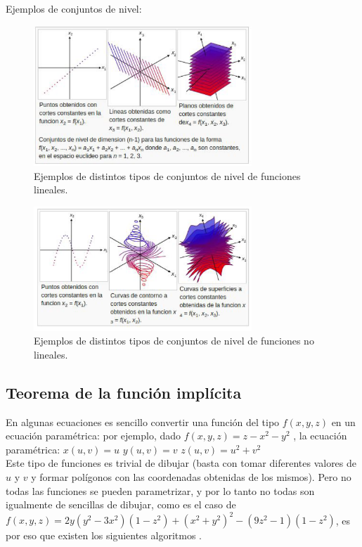 \documentclass[12pt]{article}
\begin{document}
Ejemplos de conjuntos de nivel:
\begin{figure}[h!]
\includegraphics[width=0.73\textwidth,center]{meshers1.png}
\caption{Ejemplos de distintos tipos de conjuntos de nivel de funciones lineales.}
\end{figure}
\begin{figure}[h!]
\includegraphics[width=0.73\textwidth,center]{meshers2.png}
\caption{Ejemplos de distintos tipos de conjuntos de nivel de funciones no lineales.}
\end{figure}
\clearpage
\subsection{Teorema de la función implícita}
En algunas ecuaciones es sencillo convertir una función del tipo $f(x,y,z)$ en un ecuación paramétrica: por ejemplo, dado $f(x,y,z)  = z- x^2 - y^2$ , la ecuación paramétrica: 
$x(u,v) = u$
$y(u,v) = v$
$z(u,v) = u^2+v^2$
\\Este tipo de funciones es trivial de dibujar (basta con tomar diferentes valores de $u$ y $v$ y formar polígonos con las coordenadas obtenidas de los mismos).
Pero no todas las funciones se pueden parametrizar, y por lo tanto no todas son igualmente de sencillas de dibujar, como es el caso de  $f(x,y,z) = 2y(y^2-3x^2)(1-z^2)+(x^2+y^2)^2-(9z^2-1)(1-z^2)$, es por eso que existen los siguientes algoritmos \cite{implicitas}.
\end{document}
